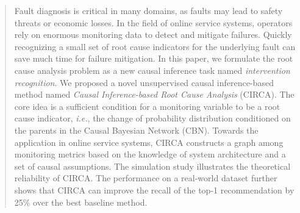 \begin{abstract}

Fault diagnosis is critical in many domains, as faults may lead to safety threats or economic losses.
In the field of online service systems, operators rely on enormous monitoring data to detect and mitigate failures.
Quickly recognizing a small set of root cause indicators for the underlying fault can save much time for failure mitigation.
In this paper, we formulate the root cause analysis problem as a new causal inference task named \textit{intervention recognition}.
We proposed a novel unsupervised causal inference-based method named \textit{Causal Inference-based Root Cause Analysis} (CIRCA).
The core idea is a sufficient condition for a monitoring variable to be a root cause indicator, \textit{i.e.}, the change of probability distribution conditioned on the parents in the Causal Bayesian Network (CBN).
Towards the application in online service systems, CIRCA constructs a graph among monitoring metrics based on the knowledge of system architecture and a set of causal assumptions.
The simulation study illustrates the theoretical reliability of CIRCA.
The performance on a real-world dataset further shows that CIRCA can improve the recall of the top-1 recommendation by 25\% over the best baseline method.

 
 
\end{abstract}
